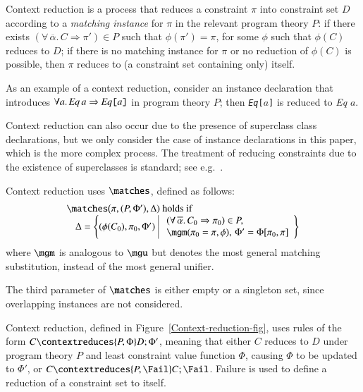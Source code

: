 \documentclass[review]{elsarticle}
\begin{document}
Context reduction is a process that reduces a constraint $\pi$ into
constraint set $D$ according to a {\it matching instance\/} for $\pi$
in the relevant program theory $P$: if there exists
$(\forall\,\overline{\alpha}.\,C\Rightarrow \pi')\in P$ such that
$\phi(\pi') = \pi$, for some $\phi$ such that $\phi(C)$ reduces to
$D$; if there is no matching instance for $\pi$ or no reduction of
$\phi(C)$ is possible, then $\pi$ reduces to (a constraint set
containing only) itself.


As an example of a context reduction, consider an instance declaration
that introduces $\forall a.\,{\it Eq\/}\, a \Rightarrow \text{\tt {\it
    Eq\/}[$a$]}$ in program theory $P$; then {\tt {\it Eq\/}[$a$]} is
reduced to {\it Eq\/} $a$.

Context reduction can also occur due to the presence of superclass
class declarations, but we only consider the case of instance
declarations in this paper, which is the more complex process. The
treatment of reducing constraints due to the existence of superclasses
is standard; see e.g.~\cite{MarkJones94a,Hall96,Faxen2002}.

Context reduction uses $\matches$, defined as follows:
  \[ \begin{array}{l}
        \matches\bigl(\pi,(P,\Phi'), \Delta) \text{ holds if }\\
          \:\:\:\: \Delta = \left\{ (\phi(C_0), \pi_0, \Phi')\,\,
          						\begin{array}{|l}
                             		\,\,(\forall\,\overline{\alpha}.\,C_0\Rightarrow \pi_0) \in P,\\
                             		\,\,\mgm(\pi_0 = \pi,\phi),\, \Phi' = \Phi[\pi_0,\pi]
                             	\end{array}\right\}
     \end{array}
  \]
where $\mgm$ is analogous to $\mgu$ but denotes the most general
matching substitution, instead of the most general unifier.

The third parameter of $\matches$ is either empty or a singleton set,
since overlapping instances \cite{ghc-users-guide} are not considered.

Context reduction, defined in Figure~\ref{Context-reduction-fig}, uses
rules of the form $C \contextreduces {P,\Phi} D;\Phi'$, meaning that
either $C$ reduces to $D$ under program theory $P$ and least
constraint value function $\Phi$, causing $\Phi$ to be updated to
$\Phi'$, or $C \contextreduces {P,\Fail} C;\Fail$. Failure is used to
define a reduction of a constraint set to itself.
\end{document}

